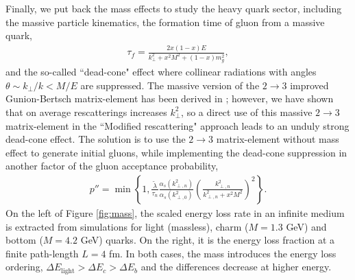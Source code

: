 \documentclass[aps, prc, reprint, amsmath, groupedaddress, nofootinbib]{revtex4-1}
\begin{document}
Finally, we put back the mass effects to study the heavy quark sector, including the massive particle kinematics, the formation time of gluon from a massive quark,
\begin{eqnarray}
\tau_{f} = \frac{2x(1-x)E}{k_\perp^2 + x^2M^2 + (1-x)m_g^2},
\end{eqnarray}
and the so-called ``dead-cone" effect where collinear radiations with angles $\theta \sim k_\perp/k < M/E$ are suppressed. 
The massive version of the $2\rightarrow3$ improved Gunion-Bertsch matrix-element has been derived in \cite{Uphoff:2014hza}; however, we have shown that on average rescatterings increases $k_{\perp}^2$, so a direct use of this massive $2\rightarrow3$ matrix-element in the ``Modified rescattering" approach leads to an unduly strong dead-cone effect.
The solution is to use the $2\rightarrow3$ matrix-element without mass effect to generate initial gluons, while implementing the dead-cone suppression in another factor of the gluon acceptance probability,
\begin{eqnarray}
p'' = \min\left\{1, \frac{\tilde{\lambda}}{\tau_n}\frac{\alpha_s(k_{\perp,n}^2)}{\alpha_s(k_{\perp,0}^2)} \left(\frac{k_{\perp,n}^2}{k_{\perp,n}^2+x^2 M^2}\right)^2\right\}.
\end{eqnarray}
On the left of Figure \ref{fig:mass}, the scaled energy loss rate in an infinite medium is extracted from simulations for light (massless), charm ($M=1.3$ GeV) and bottom ($M=4.2$ GeV) quarks. 
On the right, it is the energy loss fraction at a finite path-length $L=4$ fm.
In both cases, the mass introduces the energy loss ordering, $\Delta E_{\textrm{light}} > \Delta E_c > \Delta E_b$ and the differences decrease at higher energy.
\end{document}
